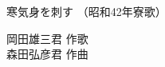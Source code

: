 \documentclass[10pt,b5j]{tarticle} %
\begin{document}
\begin{minipage}[c]{0.7\hsize} %
    \begin{center}
        {\LARGE
            寒気身を刺す %
        }
        {\small 
            （昭和42年寮歌） %
        }
    \end{center}
\end{minipage}
\begin{minipage}[c]{0.3\hsize} %
    \begin{flushright} %
        岡田雄三君 作歌\\森田弘彦君 作曲 %
    \end{flushright}
\end{minipage}
\end{document}
